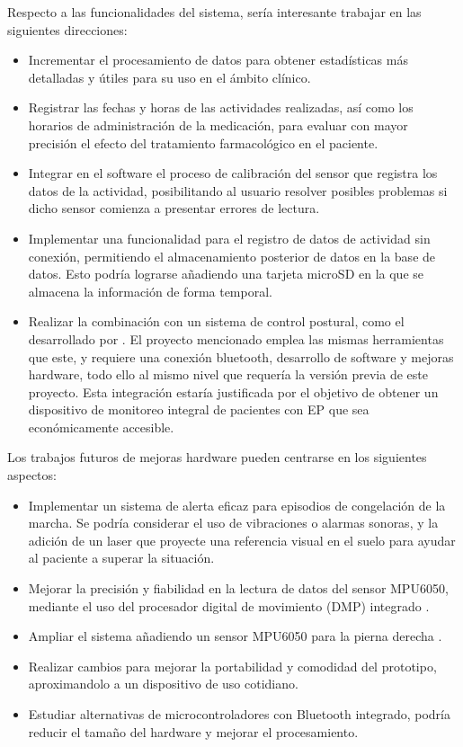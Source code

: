 Respecto a las funcionalidades del sistema, sería interesante trabajar en las siguientes direcciones:
\begin{itemize}
    \item Incrementar el procesamiento de datos para obtener estadísticas más detalladas y útiles para su uso en el ámbito clínico.
    \item Registrar las fechas y horas de las actividades realizadas, así como los horarios de administración de la medicación, para evaluar con mayor precisión el efecto del tratamiento farmacológico en el paciente.
    \item Integrar en el software el proceso de calibración del sensor que registra los datos de la actividad, posibilitando al usuario resolver posibles problemas si dicho sensor comienza a presentar errores de lectura.
    \item Implementar una funcionalidad para el registro de datos de actividad sin conexión, permitiendo el almacenamiento posterior de datos en la base de datos. Esto podría lograrse añadiendo una tarjeta microSD en la que se almacena la información de forma temporal.
    \item Realizar la combinación con un sistema de control postural, como el desarrollado por \cite{NaiaraGa53:online}. El proyecto mencionado emplea las mismas herramientas que este, y requiere una conexión bluetooth, desarrollo de software y mejoras hardware, todo ello al mismo nivel que requería la versión previa de este proyecto. Esta integración estaría justificada por el objetivo de obtener un dispositivo de monitoreo integral de pacientes con EP que sea económicamente accesible.
\end{itemize}

 Los trabajos futuros de mejoras hardware pueden centrarse en los siguientes aspectos: 
\begin{itemize}
    \item Implementar un sistema de alerta eficaz para episodios de congelación de la marcha. Se podría considerar el uso de vibraciones o alarmas sonoras, y la adición de un laser que proyecte una referencia visual en el suelo para ayudar al paciente a superar la situación.
    \item Mejorar la precisión y fiabilidad en la lectura de datos del sensor MPU6050, mediante el uso del procesador digital de movimiento (DMP) integrado \cite{saragonz91:online}.
    \item Ampliar el sistema añadiendo un sensor MPU6050 para la pierna derecha \cite{saragonz91:online}.
    \item Realizar cambios para mejorar la portabilidad y comodidad del prototipo, aproximandolo a un dispositivo de uso cotidiano.
    \item Estudiar alternativas de microcontroladores con Bluetooth integrado, podría reducir el tamaño del hardware y mejorar el procesamiento.
\end{itemize}
